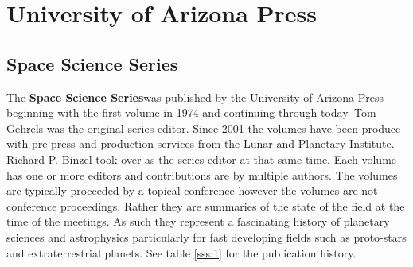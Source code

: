 
\section{University of Arizona Press}  
\subsection{Space Science Series}
The {\bfseries Space Science Series}\footnotemark was published by the
University of Arizona Press beginning with the first volume in 1974
and continuing through today.  Tom Gehrels was the original series
editor. Since 2001 the volumes have been produce with pre-press and
production services from the Lunar and Planetary Institute. Richard
P. Binzel took over as the series editor at that same time.  Each
volume has one or more editors and contributions are by multiple
authors. The volumes are typically proceeded by a topical conference
however the volumes are not conference proceedings. Rather they are
summaries of the state of the field at the time of the meetings.  As
such they represent a fascinating history of planetary sciences and
astrophysics particularly for fast developing fields such as
proto-stars and extraterrestrial planets. See table \ref{sss:1} for
the publication history.

  
